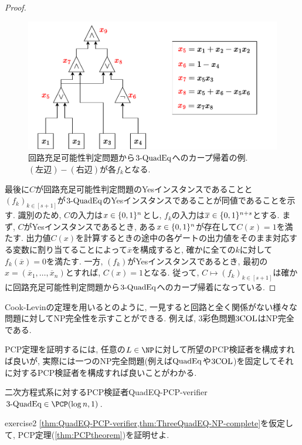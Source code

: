 \begin{proof}
  \begin{figure}[ht]
    \centering
    \includegraphics[width=\textwidth]{images/circuit_to_3-QUADEQ.pdf}
    \caption{回路充足可能性判定問題から$\text{3-QuadEq}$へのカープ帰着の例. $(\text{左辺})-(\text{右辺})$が各$f_k$となる. \label{fig:circuit-to-3-QUADEQ}}
  \end{figure}

  最後に$C$が回路充足可能性判定問題のYesインスタンスであることと$(f_k)_{k\in[s+1]}$が$\text{3-QuadEq}$のYesインスタンスであることが同値であることを示す.
  識別のため, $C$の入力は$x\in\{0,1\}^n$とし, $f_k$の入力は$\overline{x} \in \{0,1\}^{n+s}$とする.
  まず, $C$がYesインスタンスであるとき, ある$x\in\{0,1\}^n$が存在して$C(x)=1$を満たす.
  出力値$C(x)$を計算するときの途中の各ゲートの出力値をそのまま対応する変数に割り当てることによって$\overline{x}$を構成すると, 確かに全ての$k$に対して$f_k(\overline{x})=0$を満たす.
  一方, $(f_k)$がYesインスタンスであるとき, 最初の$x=(\overline{x}_1,\dots,\overline{x}_{n})$とすれば, $C(x)=1$となる.
  従って, $C\mapsto (f_k)_{k\in[s+1]}$は確かに回路充足可能性判定問題から$\text{3-QuadEq}$へのカープ帰着になっている.
\end{proof}

Cook-Levinの定理を用いると\cite{Karp1972}のように, 一見すると回路と全く関係がない様々な問題に対してNP完全性を示すことができる.
例えば, 3彩色問題$\text{3COL}$はNP完全である.

PCP定理を証明するには, 任意の$L\in\NP$に対して所望のPCP検証者を構成すれば良いが,
実際には一つのNP完全問題(例えば$\text{QuadEq}$や$\text{3COL}$)を固定してそれに対するPCP検証者を構成すれば良いことがわかる.

\begin{theorem}{二次方程式系に対するPCP検証者}{QuadEQ-PCP-verifier}
  $\ThreeQuadEQ\in \PCP(\log n,1)$.
\end{theorem}

\begin{exercise}{}{exercise2}
  \cref{thm:QuadEQ-PCP-verifier,thm:ThreeQuadEQ-NP-complete}を仮定して, PCP定理(\cref{thm:PCPtheorem})を証明せよ.
\end{exercise}

